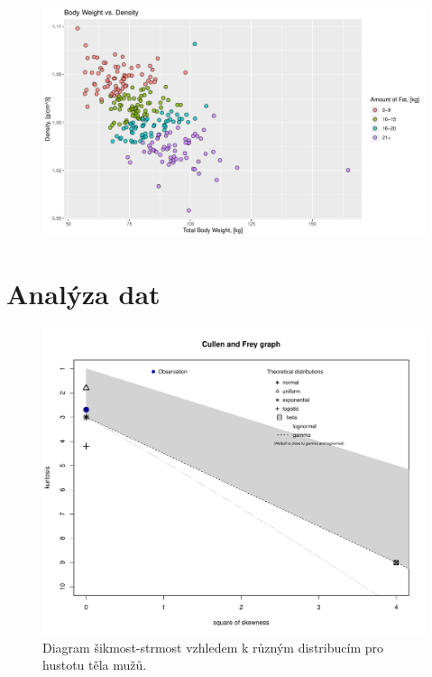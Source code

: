 \documentclass[11pt,american,czech]{article}
\begin{document}
\begin{figure}[ht!]
	\centering
	\includegraphics[width=1.0\linewidth]{Images/FIGURES/total_weight_vs_density}
	\caption{}
	\label{fig:total_weight_vs_density}
\end{figure}




\section{Analýza dat}
\newpage

\begin{figure}[ht!]
	\centering
	\includegraphics[width=0.85\linewidth]{Images/FIGURES/descdist_density}
	\caption{Diagram šikmost-strmost vzhledem k různým distribucím pro hustotu těla mužů.}
	\label{fig:descdist_density}
\end{figure}
\end{document}
